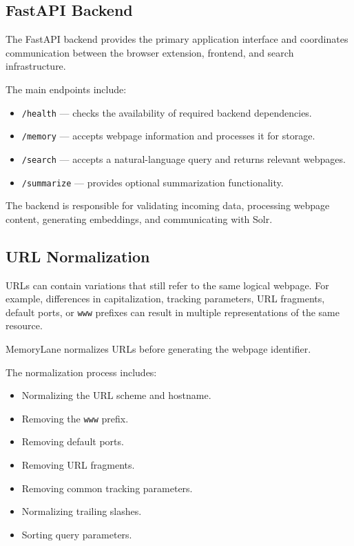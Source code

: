 \documentclass{tietreport}
\begin{document}
\subsection{FastAPI Backend}

The FastAPI backend provides the primary application interface
and coordinates communication between the browser extension,
frontend, and search infrastructure.

The main endpoints include:

\begin{itemize}
    \item \texttt{/health} --- checks the availability of
    required backend dependencies.

    \item \texttt{/memory} --- accepts webpage information and
    processes it for storage.

    \item \texttt{/search} --- accepts a natural-language query
    and returns relevant webpages.

    \item \texttt{/summarize} --- provides optional
    summarization functionality.
\end{itemize}

The backend is responsible for validating incoming data,
processing webpage content, generating embeddings, and
communicating with Solr.

\subsection{URL Normalization}

URLs can contain variations that still refer to the same
logical webpage. For example, differences in capitalization,
tracking parameters, URL fragments, default ports, or
\texttt{www} prefixes can result in multiple representations of
the same resource.

MemoryLane normalizes URLs before generating the webpage
identifier.

The normalization process includes:

\begin{itemize}
    \item Normalizing the URL scheme and hostname.
    \item Removing the \texttt{www} prefix.
    \item Removing default ports.
    \item Removing URL fragments.
    \item Removing common tracking parameters.
    \item Normalizing trailing slashes.
    \item Sorting query parameters.
\end{itemize}
\end{document}
